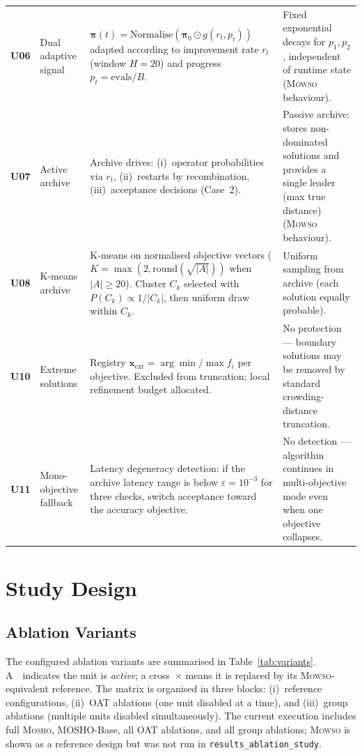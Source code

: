 \documentclass[11pt,a4paper]{article}
\newcommand{\mosho}{\textsc{Mosho}}
\newcommand{\mowso}{\textsc{Mowso}}
\begin{document}
\begin{longtable}{>{\bfseries\ttfamily}p{1.0cm} p{2.8cm} p{5.4cm} p{4.4cm}}
U06 & Dual adaptive signal &
  $\boldsymbol{\pi}(t)=\mathrm{Normalise}(\boldsymbol{\pi}_0\odot
  g(r_t,p_t))$ adapted according to improvement rate $r_t$
  (window $H{=}20$) and progress $p_t{=}\text{evals}/B$. &
  Fixed exponential decays for $p_1,p_2$, independent of runtime state
  (\mowso{} behaviour). \\[4pt]

U07 & Active archive &
  Archive drives: (i)~operator probabilities via $r_t$,
  (ii)~restarts by recombination, (iii)~acceptance decisions (Case~2). &
  Passive archive: stores non-dominated solutions and provides
  a single leader (max true distance) (\mowso{} behaviour). \\[4pt]


U08 & K-means archive &
  K-means on normalised objective vectors
  ($K=\max(2,\mathrm{round}(\sqrt{|A|}))$ when $|A|\ge 20$).
  Cluster $C_k$ selected with $P(C_k)\propto 1/|C_k|$,
  then uniform draw within $C_k$. &
  Uniform sampling from archive (each solution equally probable). \\[4pt]

U10 & Extreme solutions &
  Registry $\mathbf{x}_{\mathrm{ext}}=\arg\min/\max f_i$ per objective.
  Excluded from truncation; local refinement budget allocated. &
  No protection --- boundary solutions may be removed by standard
  crowding-distance truncation. \\[4pt]

U11 & Mono-objective fallback &
  Latency degeneracy detection: if the archive latency range is below
  $\varepsilon{=}10^{-3}$ for three checks, switch acceptance toward the
  accuracy objective. &
  No detection --- algorithm continues in multi-objective mode even when
  one objective collapses. \\
\end{longtable}




\section{Study Design}
\label{sec:design}

\subsection{Ablation Variants}
\label{sec:design_variants}

The configured ablation variants are summarised in Table~\ref{tab:variants}.
A~\checkmark\ indicates the unit is \emph{active}; a cross~$\times$ means
it is replaced by its \mowso{}-equivalent reference.  The matrix is
organised in three blocks: (i)~reference configurations, (ii)~OAT
ablations (one unit disabled at a time), and (iii)~group ablations
(multiple units disabled simultaneously).  The current execution includes
full \mosho{}, MOSHO-Base, all OAT ablations, and all group ablations;
\mowso{} is shown as a reference design but was not run in
\texttt{results\_ablation\_study}.
\end{document}
